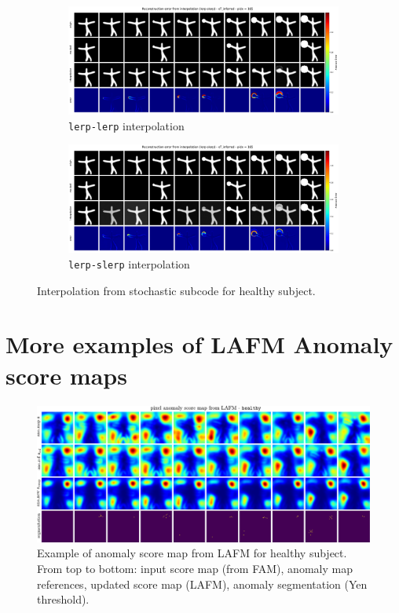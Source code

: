 \begin{figure}[htbp]
  \centering
  \begin{subfigure}{0.8\linewidth}
    \includegraphics[width=\linewidth]{figures/interpolation-lerp-lerp-id-165.pdf}
    \caption{\texttt{lerp-lerp} interpolation}
  \end{subfigure}

  \begin{subfigure}{0.8\linewidth}
    \includegraphics[width=\linewidth]{figures/interpolation-lerp-slerp-id-165.pdf}
    \caption{\texttt{lerp-slerp} interpolation}
  \end{subfigure}
  \caption{Interpolation from stochastic subcode for healthy subject. }
  \label{fig:interpolation-ano}
\end{figure}

\chapter{More examples of LAFM Anomaly score maps}
\begin{figure}[htbp]
  \centering
  \includegraphics[width=0.75\linewidth]{figures/app-lafm-healthy.pdf}
  \caption[Example: anomaly segmentation from LAFM - \texttt{healthy} subject]{Example of anomaly score map from LAFM for healthy subject. From top to bottom: input score map (from FAM), anomaly map references, updated score map (LAFM), anomaly segmentation (Yen threshold).}
\end{figure}

